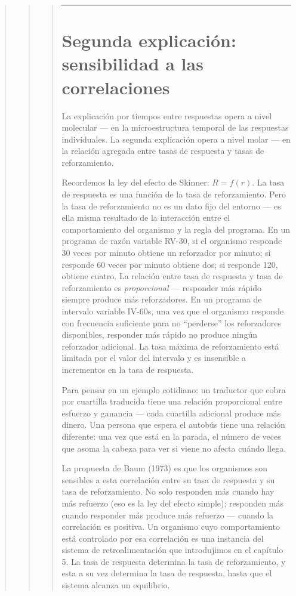 \documentclass[
  letterpaper,
  DIV=11,
  numbers=noendperiod]{scrreprt}
\begin{document}
\begin{tcolorbox}[enhanced jigsaw, arc=.35mm, bottomrule=.15mm, breakable, colback=white, colframe=quarto-callout-note-color-frame, left=2mm, leftrule=.75mm, opacityback=0, rightrule=.15mm, toprule=.15mm]
\begin{quote}
\begin{quote}
\begin{quote}
\begin{center}\rule{0.5\linewidth}{0.5pt}\end{center}

\mbox{}%
\section{Segunda explicación: sensibilidad a las
correlaciones}\label{segunda-explicaciuxf3n-sensibilidad-a-las-correlaciones}

La explicación por tiempos entre respuestas opera a nivel molecular ---
en la microestructura temporal de las respuestas individuales. La
segunda explicación opera a nivel molar --- en la relación agregada
entre tasas de respuesta y tasas de reforzamiento.

Recordemos la ley del efecto de Skinner: \(R = f(r)\). La tasa de
respuesta es una función de la tasa de reforzamiento. Pero la tasa de
reforzamiento no es un dato fijo del entorno --- es ella misma resultado
de la interacción entre el comportamiento del organismo y la regla del
programa. En un programa de razón variable RV-30, si el organismo
responde 30 veces por minuto obtiene un reforzador por minuto; si
responde 60 veces por minuto obtiene dos; si responde 120, obtiene
cuatro. La relación entre tasa de respuesta y tasa de reforzamiento es
\emph{proporcional} --- responder más rápido siempre produce más
reforzadores. En un programa de intervalo variable IV-60s, una vez que
el organismo responde con frecuencia suficiente para no ``perderse'' los
reforzadores disponibles, responder más rápido no produce ningún
reforzador adicional. La tasa máxima de reforzamiento está limitada por
el valor del intervalo y es insensible a incrementos en la tasa de
respuesta.

Para pensar en un ejemplo cotidiano: un traductor que cobra por
cuartilla traducida tiene una relación proporcional entre esfuerzo y
ganancia --- cada cuartilla adicional produce más dinero. Una persona
que espera el autobús tiene una relación diferente: una vez que está en
la parada, el número de veces que asoma la cabeza para ver si viene no
afecta cuándo llega.

La propuesta de Baum (1973) es que los organismos son sensibles a esta
correlación entre su tasa de respuesta y su tasa de reforzamiento. No
solo responden más cuando hay más refuerzo (eso es la ley del efecto
simple); responden más cuando responder más produce más refuerzo ---
cuando la correlación es positiva. Un organismo cuyo comportamiento está
controlado por esa correlación es una instancia del sistema de
retroalimentación que introdujimos en el capítulo 5. La tasa de
respuesta determina la tasa de reforzamiento, y esta a su vez determina
la tasa de respuesta, hasta que el sistema alcanza un equilibrio.


\end{quote}
\end{quote}
\end{quote}
\end{tcolorbox}
\end{document}
